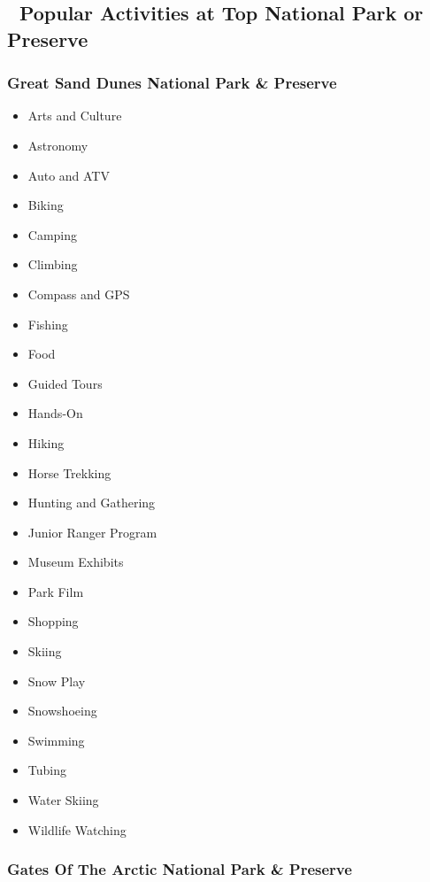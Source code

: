 \documentclass[
  letterpaper,
  DIV=11,
  numbers=noendperiod]{scrartcl}
\providecommand{\tightlist}{%
  \setlength{\itemsep}{0pt}\setlength{\parskip}{0pt}}\usepackage{longtable,booktabs,array}
\begin{document}
\subsection{🥾 Popular Activities at Top National Park or
Preserve}\label{popular-activities-at-top-national-park-or-preserve}

\subsubsection{Great Sand Dunes National Park \&
Preserve}\label{great-sand-dunes-national-park-preserve}

\begin{itemize}
\tightlist
\item
  Arts and Culture
\item
  Astronomy
\item
  Auto and ATV
\item
  Biking
\item
  Camping
\item
  Climbing
\item
  Compass and GPS
\item
  Fishing
\item
  Food
\item
  Guided Tours
\item
  Hands-On
\item
  Hiking
\item
  Horse Trekking
\item
  Hunting and Gathering
\item
  Junior Ranger Program
\item
  Museum Exhibits
\item
  Park Film
\item
  Shopping
\item
  Skiing
\item
  Snow Play
\item
  Snowshoeing
\item
  Swimming
\item
  Tubing
\item
  Water Skiing
\item
  Wildlife Watching
\end{itemize}

\subsubsection{Gates Of The Arctic National Park \&
Preserve}\label{gates-of-the-arctic-national-park-preserve}
\end{document}
